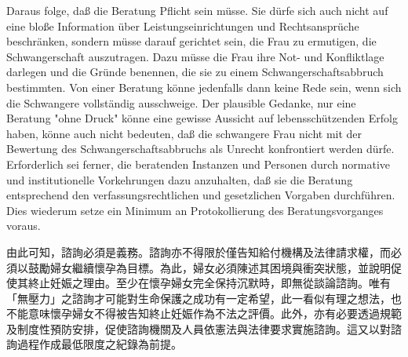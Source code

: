 \documentclass[12pt]{article}
\begin{document}
\begin{sourcepara}[title={原文C.8}]
Daraus folge, daß die Beratung Pflicht sein müsse. Sie dürfe sich auch nicht auf eine bloße Information über Leistungseinrichtungen und Rechtsansprüche beschränken, sondern müsse darauf gerichtet sein, die Frau zu ermutigen, die Schwangerschaft auszutragen. Dazu müsse die Frau ihre Not- und Konfliktlage darlegen und die Gründe benennen, die sie zu einem Schwangerschaftsabbruch bestimmten. Von einer Beratung könne jedenfalls dann keine Rede sein, wenn sich die Schwangere vollständig ausschweige. Der plausible Gedanke, nur eine Beratung "ohne Druck" könne eine gewisse Aussicht auf lebensschützenden Erfolg haben, könne auch nicht bedeuten, daß die schwangere Frau nicht mit der Bewertung des Schwangerschaftsabbruchs als Unrecht konfrontiert werden dürfe. Erforderlich sei ferner, die beratenden Instanzen und Personen durch normative und institutionelle Vorkehrungen dazu anzuhalten, daß sie die Beratung entsprechend den verfassungsrechtlichen und gesetzlichen Vorgaben durchführen. Dies wiederum setze ein Minimum an Protokollierung des Beratungsvorganges voraus.
\end{sourcepara}
\begin{transpara}
由此可知，諮詢必須是義務。諮詢亦不得限於僅告知給付機構及法律請求權，而必須以鼓勵婦女繼續懷孕為目標。為此，婦女必須陳述其困境與衝突狀態，並說明促使其終止妊娠之理由。至少在懷孕婦女完全保持沉默時，即無從談論諮詢。唯有「無壓力」之諮詢才可能對生命保護之成功有一定希望，此一看似有理之想法，也不能意味懷孕婦女不得被告知終止妊娠作為不法之評價。此外，亦有必要透過規範及制度性預防安排，促使諮詢機關及人員依憲法與法律要求實施諮詢。這又以對諮詢過程作成最低限度之紀錄為前提。
\end{transpara}
\end{document}
